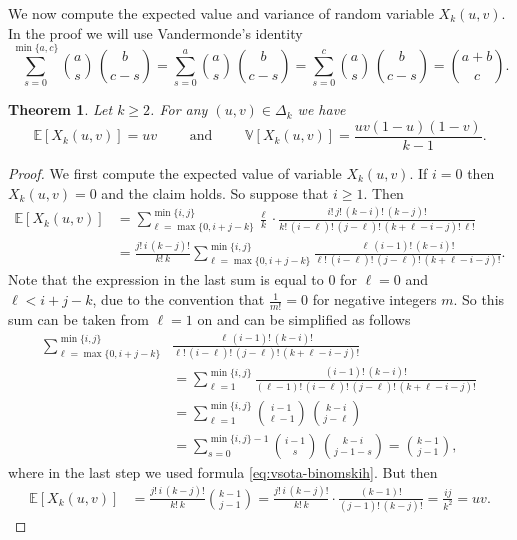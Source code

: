 \documentclass[12pt,a4paper]{amsart}
\newtheorem{theorem}{Theorem}[section]
\theoremstyle{definition}
\newcommand{\DK}{\Delta_k}
\newcommand{\EE}{\mathbb{E}}
\newcommand{\VV}{\mathbb{V}}
\begin{document}
We now compute the expected value and variance of random variable $X_k(u,v)$. In the proof we will use Vandermonde's identity
\begin{equation} \label{eq:vsota-binomskih}
   \sum_{s=0}^{\min\{a,c \}} \binom{a}{s} \, \binom{b}{c-s}  = \sum_{s=0}^{a} \binom{a}{s} \, \binom{b}{c-s} = \sum_{s=0}^c \binom{a}{s} \, \binom{b}{c-s} = \binom{a+b}{c}.
\end{equation}

\begin{theorem} \label{th:exk}
    Let $k\ge 2$. For any $(u,v) \in \DK$ we have 
    $$ \EE[X_k(u,v)] = uv \qquad \text{ and } \qquad \VV[X_k(u,v)] = \frac{uv(1-u)(1-v)}{k-1}.$$
\end{theorem}

\begin{proof}
We first compute the expected value of variable $X_k(u,v)$. If $i=0$ then $X_k(u,v) = 0$ and the claim holds. So suppose that $i\ge 1$. Then
\begin{align*}
    \EE[X_k(u,v)] &= \sum_{\ell=\max \{ 0,i+j-k\}}^{\min \{i, j\}} \frac{\ell}{k}\cdot  \frac{i! \, j! \, (k-i)! \, (k-j)!}{k! \, (i-\ell)! \, (j-\ell)! \, (k+\ell-i-j)! \, \ell!} \\
    &= \frac{j! \, i \, (k-j)!}{k! \, k} \sum_{\ell=\max \{ 0,i+j-k\}}^{\min \{i, j\}} \frac{\ell\, (i-1)! \, (k-i)!}{\ell! \, (i-\ell)! \, (j-\ell)! \, (k+\ell-i-j)!}.
\end{align*}
Note that the  expression in the last sum is equal to $0$ for $\ell = 0$ and $\ell < i+j-k$, due to the convention that $\tfrac{1}{m!}=0$ for negative integers $m$. So this sum can be taken from $\ell =1$ on and can be simplified as follows
\begin{align*}
    \sum_{\ell=\max \{ 0,i+j-k\}}^{\min \{i, j\}} &\frac{\ell\, (i-1)! \, (k-i)!}{\ell! \, (i-\ell)! \, (j-\ell)! \, (k+\ell-i-j)!}\\
    &= \sum_{\ell=1}^{\min \{i, j\}} \frac{(i-1)! \, (k-i)!}{(\ell-1)! \, (i-\ell)! \, (j-\ell)! \, (k+\ell-i-j)!} \\
    &= \sum_{\ell=1}^{\min \{i, j\}} \binom{i-1}{\ell-1} \, \binom{k-i}{j-\ell} \\
    &= \sum_{s=0}^{\min \{i, j\}-1} \binom{i-1}{s} \, \binom{k-i}{j-1-s} = \binom{k-1}{j-1},
\end{align*}
where in the last step we used formula \eqref{eq:vsota-binomskih}.
But then
\begin{align*}
    \EE[X_k(u,v)] &= \frac{j! \, i \, (k-j)!}{k! \, k} \binom{k-1}{j-1} = \frac{j! \, i \, (k-j)!}{k! \, k} \cdot \frac{(k-1)!}{(j-1)! \, (k-j)!} = \frac{ij}{k^2} = uv.
\end{align*}


\end{proof}
\end{document}
